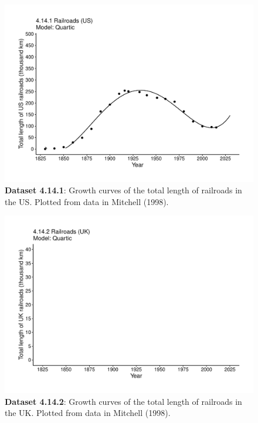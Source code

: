 \documentclass[aps,rmp,preprint,superscriptaddress,10pt,onecolumn]{article}
\begin{document}
\clearpage
\begin{figure}[h]
\includegraphics[width=\textwidth]{output/figs-ggplot/4.14.1.pdf}
\caption{\textbf{Dataset 4.14.1}: Growth curves of the total length of railroads in the US. Plotted from data in Mitchell (1998).}
\end{figure}
	
\clearpage
\begin{figure}[h]
\includegraphics[width=\textwidth]{output/figs-ggplot/4.14.2.pdf}
\caption{\textbf{Dataset 4.14.2}: Growth curves of the total length of railroads in the UK. Plotted from data in Mitchell (1998).}
\end{figure}
	
\end{document}
